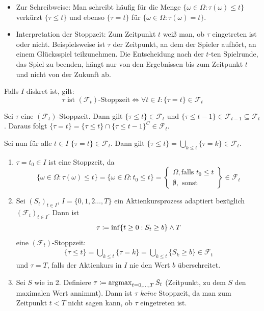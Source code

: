 \documentclass[a4paper,twoside,DIV15,BCOR12mm]{scrbook}
\newcommand{\cF}{\mathcal F}
\begin{document}
\begin{bemerkung}
\begin{itemize}
\item Zur Schreibweise: Man schreibt häufig für die Menge $\{\omega\in\Omega: \tau(\omega)\le t\}$ verkürzt $\{\tau \le t\}$ und ebenso $\{\tau = t\}$ für $\{\omega\in\Omega: \tau(\omega)= t\}$.
\item Interpretation der Stoppzeit: Zum Zeitpunkt $t$ weiß man, ob $\tau$ eingetreten ist oder nicht. Beispielsweise ist $\tau$ der Zeitpunkt, an dem der Spieler aufhört, an einem Glücksspiel teilzunehmen. Die Entscheidung nach der $t$-ten Spielrunde, das Spiel zu beenden, hängt nur von den Ergebnissen bis zum Zeitpunkt $t$ und nicht von der Zukunft ab.
\end{itemize}
\end{bemerkung}

\begin{lemma}
Falls $I$ diskret ist, gilt:
\[
\text{$\tau$ ist $(\cF_t)$-Stoppzeit} \iff \forall t\in I: \{\tau = t\}\in \cF_t
\]
\end{lemma}
\begin{beweis}
Sei $\tau$ eine $(\cF_t)$-Stoppzeit. Dann gilt $\{\tau \le t\} \in \cF_t$ und $\{\tau \le t-1\}\in \cF_{t-1}\subseteq \cF_t$. Daraus folgt $\{\tau=t\}=\{\tau \leq t\} \cap \{\tau \leq t-1\}^C \in \cF_t$.

Sei nun für alle $t\in I$ $\{\tau = t\} \in \cF_t$. Dann gilt $\{\tau \le t\} = \bigcup_{k\le t} \{\tau = k\} \in \cF_t$.
\end{beweis}

\begin{beispiel}
\begin{enumerate}
\label{bsp:2.1.24}\item $\tau = t_0 \in I$ ist eine Stoppzeit, da
\[
\{\omega\in\Omega : \tau (\omega) \le t\}
= \{\omega\in\Omega: t_0\le t\}
= 
\left.
\begin{cases}
\Omega, \text{falls $t_0\le t$}\\
\emptyset, \text{ sonst}
\end{cases}
\right\}
\in \cF_t
\]
\item Sei $(S_t)_{t\in I}$, $I=\{0, 1, 2\ldots,T\}$ ein Aktienkursprozess  adaptiert bezüglich $(\cF_t)_{t\in I}$. Dann ist
\[
\tau \da \inf \{ t\ge 0: S_t \ge b \} \wedge T
\]
eine $(\cF_t)$-Stoppzeit:
\begin{align*}
\{\tau \le t\} = \bigcup_{k\le t} \{\tau = k\} = \bigcup_{k\le t} \{S_k \ge b\} \in \cF_t
\end{align*}
und $\tau = T$, falls der Aktienkurs in $I$ nie den Wert $b$ überschreitet.
\item  Sei $S$ wie in 2. Definiere $\tau \da \operatorname{argmax}_{t=0,\ldots,T} S_t$ (Zeitpunkt, zu dem $S$ den maximalen Wert annimmt). Dann ist $\tau$ \emph{keine} Stoppzeit, da man zum Zeitpunkt $t<T$ nicht sagen kann, ob $\tau$ eingetreten ist.
\end{enumerate}
\end{beispiel}
\end{document}
